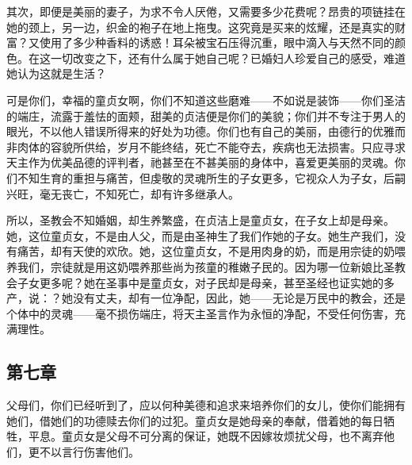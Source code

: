 其次，即便是美丽的妻子，为求不令人厌倦，又需要多少花费呢？昂贵的项链挂在她的颈上，另一边，织金的袍子在地上拖曳。这究竟是买来的炫耀，还是真实的财富？又使用了多少种香料的诱惑！耳朵被宝石压得沉重，眼中滴入与天然不同的颜色。在这一切改变之下，还有什么属于她自己呢？已婚妇人珍爱自己的感受，难道她认为这就是生活？\par

可是你们，幸福的童贞女啊，你们不知道这些磨难——不如说是装饰——你们圣洁的端庄，流露于羞怯的面颊，甜美的贞洁便是你们的美貌；你们并不专注于男人的眼光，不以他人错误所得来的好处为功德。你们也有自己的美丽，由德行的优雅而非肉体的容貌所供给，岁月不能终结，死亡不能夺去，疾病也无法损害。只应寻求天主作为优美品德的评判者，祂甚至在不甚美丽的身体中，喜爱更美丽的灵魂。你们不知生育的重担与痛苦，但虔敬的灵魂所生的子女更多，它视众人为子女，后嗣兴旺，毫无丧亡，不知死亡，却有许多继承人。\par

所以，圣教会不知婚姻，却生养繁盛，在贞洁上是童贞女，在子女上却是母亲。她，这位童贞女，不是由人父，而是由圣神生了我们作她的子女。她生产我们，没有痛苦，却有天使的欢欣。她，这位童贞女，不是用肉身的奶，而是用宗徒的奶喂养我们，宗徒就是用这奶喂养那些尚为孩童的稚嫩子民的。因为哪一位新娘比圣教会子女更多呢？她在圣事中是童贞女，对子民却是母亲，甚至圣经也证实她的多产，说：？她没有丈夫，却有一位净配，因此，她——无论是万民中的教会，还是个体中的灵魂——毫不损伤端庄，将天主圣言作为永恒的净配，不受任何伤害，充满理性。\par


\subsection{第七章}

\par

父母们，你们已经听到了，应以何种美德和追求来培养你们的女儿，使你们能拥有她们，借她们的功德赎去你们的过犯。童贞女是她母亲的奉献，借着她的每日牺牲，平息。童贞女是父母不可分离的保证，她既不因嫁妆烦扰父母，也不离弃他们，更不以言行伤害他们。\par

